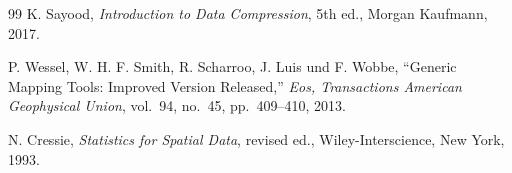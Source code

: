 ﻿\documentclass[a4paper,12pt]{article}
\theoremstyle{definition}
\begin{document}
\begin{thebibliography}{99}
K. Sayood,
\textit{Introduction to Data Compression}, 5th ed.,
Morgan Kaufmann, 2017.

P. Wessel, W. H. F. Smith, R. Scharroo, J. Luis und F. Wobbe,
``Generic Mapping Tools: Improved Version Released,''
\textit{Eos, Transactions American Geophysical Union},
vol.~94, no.~45, pp.~409--410, 2013.

N. Cressie,
\textit{Statistics for Spatial Data}, revised ed.,
Wiley-Interscience, New York, 1993.


\end{thebibliography}
\end{document}
